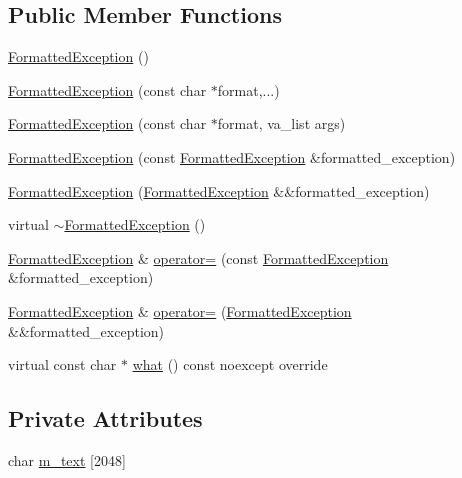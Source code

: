 \subsection*{Public Member Functions}
\begin{DoxyCompactItemize}
\item 
\hyperlink{structmage_1_1_formatted_exception_a77b82a969ec33a3aacec74a5adc4ab8b}{Formatted\+Exception} ()
\item 
\hyperlink{structmage_1_1_formatted_exception_a3fe833a49052a2db99c023b1b1d43621}{Formatted\+Exception} (const char $\ast$format,...)
\item 
\hyperlink{structmage_1_1_formatted_exception_a5cf97b252c3eb38acc1554ab6bb7e300}{Formatted\+Exception} (const char $\ast$format, va\+\_\+list args)
\item 
\hyperlink{structmage_1_1_formatted_exception_afd5d6b7a9db65b127badbf498186ebe8}{Formatted\+Exception} (const \hyperlink{structmage_1_1_formatted_exception}{Formatted\+Exception} \&formatted\+\_\+exception)
\item 
\hyperlink{structmage_1_1_formatted_exception_ab1371b0a079fc50fcae39722e5e29cb2}{Formatted\+Exception} (\hyperlink{structmage_1_1_formatted_exception}{Formatted\+Exception} \&\&formatted\+\_\+exception)
\item 
virtual \hyperlink{structmage_1_1_formatted_exception_a7bd56fe92b62d08b5ca4fb86592f1302}{$\sim$\+Formatted\+Exception} ()
\item 
\hyperlink{structmage_1_1_formatted_exception}{Formatted\+Exception} \& \hyperlink{structmage_1_1_formatted_exception_acc0ecbe1d510c5103ff4fd5b7054213b}{operator=} (const \hyperlink{structmage_1_1_formatted_exception}{Formatted\+Exception} \&formatted\+\_\+exception)
\item 
\hyperlink{structmage_1_1_formatted_exception}{Formatted\+Exception} \& \hyperlink{structmage_1_1_formatted_exception_aed7565e923543206710aa5f71ba5893a}{operator=} (\hyperlink{structmage_1_1_formatted_exception}{Formatted\+Exception} \&\&formatted\+\_\+exception)
\item 
virtual const char $\ast$ \hyperlink{structmage_1_1_formatted_exception_af24583c71b3cb760039f35d534b95ead}{what} () const noexcept override
\end{DoxyCompactItemize}
\subsection*{Private Attributes}
\begin{DoxyCompactItemize}
\item 
char \hyperlink{structmage_1_1_formatted_exception_aadccdcc1db09285dadc6b5a30681e05b}{m\+\_\+text} \mbox{[}2048\mbox{]}
\end{DoxyCompactItemize}


